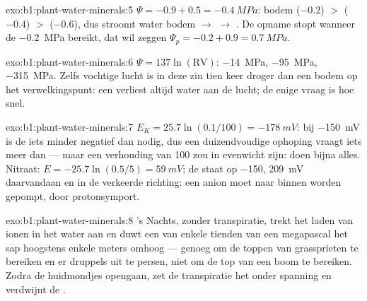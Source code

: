 \begin{solution}{exo:b1:plant-water-minerals:5}
 $\Psi = -0.9 + 0.5 = \qty{-0.4}{MPa}$: bodem ($-0.2$) $>$ 
($-0.4$) $>$  ($-0.6$), dus stroomt water bodem $\to$  $\to$
. De opname stopt wanneer de  \qty{-0.2}{MPa} bereikt, dat wil
zeggen $\Psi_p = -0.2 + 0.9 = \qty{0.7}{MPa}$.
\end{solution}

\begin{solution}{exo:b1:plant-water-minerals:6}
$\Psi = 137\ln(\text{RV})$: \qty{-14}{MPa}, \qty{-95}{MPa},
\qty{-315}{MPa}. Zelfs vochtige lucht is in deze zin tien keer droger dan
een bodem op het verwelkingspunt: een  verliest altijd water aan de
lucht; de enige vraag is hoe snel.
\end{solution}

\begin{solution}{exo:b1:plant-water-minerals:7}
$E_K = 25.7\ln(0.1/100) = \qty{-178}{mV}$: bij \qty{-150}{mV} is de 
iets minder negatief dan nodig, dus een duizendvoudige ophoping vraagt iets
meer dan  --- maar een verhouding van 100 zou in evenwicht zijn:
 doen bijna alles. Nitraat: $E = -25.7\ln(0.5/5)
= \qty{+59}{mV}$; de  staat op \qty{-150}{}, \qty{209}{mV} daarvandaan
en in de verkeerde richting: een anion moet naar binnen worden gepompt,
door protonsymport.
\end{solution}

\begin{solution}{exo:b1:plant-water-minerals:8}
's Nachts, zonder transpiratie, trekt het laden van ionen in het 
water aan en duwt een  van enkele tienden van een megapascal het
sap hoogstens enkele meters omhoog --- genoeg om de toppen van grassprieten
te bereiken en er druppels uit te persen, niet om de top van een boom te
bereiken. Zodra de huidmondjes opengaan, zet de transpiratie het 
onder spanning en verdwijnt de .
\end{solution}

